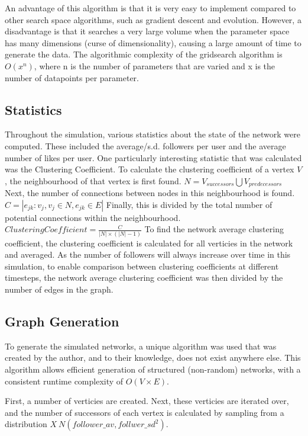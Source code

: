 \documentclass{article}
\begin{document}
An advantage of this algorithm is that it is very easy to implement compared to
other search space algorithms, such as gradient descent and evolution.
However, a disadvantage is that it searches a very large volume when the parameter
space has many dimensions (curse of dimensionality), causing a large amount of
time to generate the data. The algorithmic complexity of the gridsearch algorithm
is $O(x^n)$, where n is the number of parameters that are varied and x is the number
of datapoints per parameter.

\subsection{Statistics}
Throughout the simulation, various statistics about the state of the network were
computed. These included the average/s.d. followers per user and the average number of likes
per user.
One particularly interesting statistic that was calculated was the Clustering Coefficient.
To calculate the clustering coefficient of a vertex $V$, the neighbourhood of that
vertex is first found.
$N = V_{successors} \bigcup V_{predecessors}$
Next, the number of connections between nodes in this neighbourhood is found.
$C = |{e_{jk} : v_j, v_j \in N, e_{jk} \in E}|$
Finally, this is divided by the total number of potential connections within the neighbourhood.
$\mathit{Clustering Coefficient} = \frac{C}{|N| \times (|N| - 1)}$
To find the network average clustering coefficient, the clustering coefficient
is calculated for all verticies in the network and averaged.
As the number of followers will always increase over time in this simulation,
to enable comparison between clustering coefficients at different timesteps,
the network average clustering coefficient was then divided by the number
of edges in the graph.

\subsection{Graph Generation}

To generate the simulated networks, a unique algorithm was used
that was created by the author, and to their knowledge, does not exist anywhere else.
This algorithm allows efficient generation of structured (non-random) networks,
with a consistent runtime complexity of $O\left(V \times E\right)$.

First, a number of verticies are created.
Next, these verticies are iterated over, and the number of successors of each
vertex is calculated by sampling from a distribution $X ~ N\left(follower\_av, follwer\_sd^2\right)$.
\end{document}
